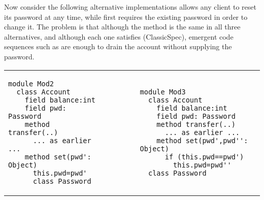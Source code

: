  

Now consider the following alternative implementations
 allows any client to reset its password at any time, while
 first requires the existing password in order to change it.
The problem is that although the  method is the same in
all three alternatives, and although each one satisfies (ClassicSpec),
emergent code sequences such as
%
%
are enough to drain the account  without supplying the password.


  
%
  
  
\begin{tabular}{lll}
  \begin{minipage}{0.35\textwidth}
    \vfill
\begin{lstlisting}[language=chainmail]
module Mod2
  class Account
    field balance:int 
    field pwd: Password 
    method transfer(..) 
      ... as earlier ...
    method set(pwd': Object)
      this.pwd=pwd'
      class Password
\end{lstlisting}
\end{minipage}
  &\ \ \  \ \   &
\begin{minipage}{0.50\textwidth}
\begin{lstlisting}[language=chainmail]
module Mod3
  class Account
    field balance:int 
    field pwd: Password 
    method transfer(..) 
      ... as earlier ...
    method set(pwd',pwd'': Object)
      if (this.pwd==pwd') 
        this.pwd=pwd''
  class Password
\end{lstlisting}
\end{minipage} 
 \end{tabular}


